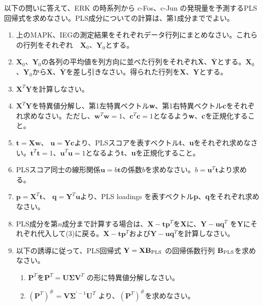 \indent 以下の問いに答えて、ERK の時系列から c-Fos、c-Jun の発現量を予測するPLS回帰式を求めなさい。PLS成分についての計算は、第1成分まででよい。

\renewcommand{\labelenumi}{(\arabic{enumi})}
\begin{enumerate}
\item 上のMAPK、IEGの測定結果をそれぞれデータ行列にまとめなさい。これらの行列をそれぞれ　\({\mathbf X}_0\)、\({\mathbf Y}_0\)とする。
\item \({\mathbf X}_0\)、\({\mathbf Y}_0\)の各列の平均値を列方向に並べた行列をそれぞれ\(\bar{\mathbf X}\)、\(\bar{\mathbf Y}\)とする。\({\mathbf X}_0\)、\({\mathbf Y}_0\)から\(\bar{\mathbf X}\)、\(\bar{\mathbf Y}\)を差し引きなさい。得られた行列を\({\mathbf X}\)、\({\mathbf Y}\)とする。
\item \({\mathbf X}^T{\mathbf Y}\)を計算しなさい。
\item \({\mathbf X}^T{\mathbf Y}\)を特異値分解し、第1左特異ベクトル{\bf w}、第1右特異ベクトル{\bf c}をそれぞれ求めなさい。ただし、\({\mathbf w}^T{\mathbf w}=1\)、\({\mathbf c}^T{\mathbf c}=1\)となるよう{\bf w}、{\bf c}を正規化すること。
\item \({\mathbf t}={\mathbf X}{\mathbf w}\)、 \({\mathbf u}={\mathbf Y}{\mathbf c}\)より、PLSスコアを表すベクトル{\bf t}、{\bf u}をそれぞれ求めなさい。\({\mathbf t}^T{\mathbf t}=1\)、\({\mathbf u}^T{\mathbf u}=1\)となるよう{\bf t}、{\bf u}を正規化すること。
\item PLSスコア同士の線形関係\({\mathbf u} = b{\mathbf t}\)の係数\(b\)を求めなさい。\(b={\mathbf u}^T{\mathbf t}\)より求める。
\item \({\mathbf p}={\mathbf X}^T{\mathbf t}\)、 \({\mathbf q}={\mathbf Y}^T{\mathbf u}\)より、PLS loadings を表すベクトル{\bf p}、{\bf q}をそれぞれ求めなさい。
\item PLS成分を第\(n\)成分まで計算する場合は、\({\mathbf X} - {\mathbf t}{\mathbf p}^T\)を{\bf X}に、\({\mathbf Y}- {\mathbf u}{\mathbf q}^T\) を{\bf Y}にそれぞれ代入して(3)に戻る。\({\mathbf X} - {\mathbf t}{\mathbf p}^T\)および\({\mathbf Y}- {\mathbf u}{\mathbf q}^T\)を計算しなさい。
\item 以下の誘導に従って、PLS回帰式 \({\mathbf Y} = {\mathbf X}{\mathbf B}_{\rm PLS}\) の回帰係数行列 \({\mathbf B}_{\rm PLS}\)を求めなさい。
\begin{enumerate}
\item \({\mathbf P}^T\)を\({\mathbf P}^T={\mathbf U}{\mathbf \Sigma}{\mathbf V}^T\) の形に特異値分解しなさい。
\item \(({\mathbf P}^T)^\#={\mathbf V}{\mathbf \Sigma^{\prime -1}}{\mathbf U}^T\) より、\(({\mathbf P}^T)^\#\)を求めなさい。

\end{enumerate}
\end{enumerate}

